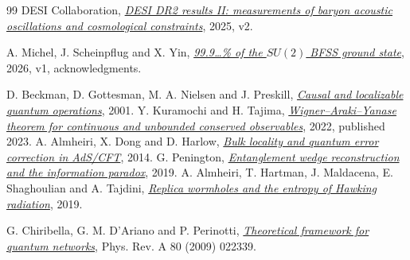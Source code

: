 \begin{thebibliography}{99}
 DESI Collaboration, \href{https://arxiv.org/abs/2503.14738v2}{\emph{DESI DR2 results II: measurements of baryon acoustic oscillations and cosmological constraints}}, 2025, v2.

 A. Michel, J. Scheinpflug and X. Yin, \href{https://arxiv.org/html/2611.09837v1}{\emph{99.9\ldots\% of the \(SU(2)\) BFSS ground state}}, 2026, v1, acknowledgments.

 D. Beckman, D. Gottesman, M. A. Nielsen and J. Preskill, \href{https://arxiv.org/abs/quant-ph/0102043}{\emph{Causal and localizable quantum operations}}, 2001.
 Y. Kuramochi and H. Tajima, \href{https://arxiv.org/abs/2208.13494}{\emph{Wigner--Araki--Yanase theorem for continuous and unbounded conserved observables}}, 2022, published 2023.
 A. Almheiri, X. Dong and D. Harlow, \href{https://arxiv.org/abs/1411.7041}{\emph{Bulk locality and quantum error correction in AdS/CFT}}, 2014.
 G. Penington, \href{https://arxiv.org/abs/1905.08255}{\emph{Entanglement wedge reconstruction and the information paradox}}, 2019.
 A. Almheiri, T. Hartman, J. Maldacena, E. Shaghoulian and A. Tajdini, \href{https://arxiv.org/abs/1911.12333}{\emph{Replica wormholes and the entropy of Hawking radiation}}, 2019.

 G. Chiribella, G. M. D'Ariano and P. Perinotti, \href{https://arxiv.org/abs/0904.4483}{\emph{Theoretical framework for quantum networks}}, Phys. Rev. A 80 (2009) 022339.
\end{thebibliography}

